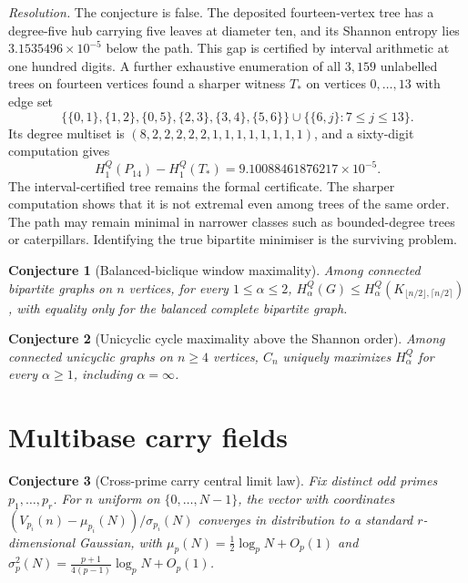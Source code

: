 \documentclass[11pt]{article}
\newtheorem{conjecture}{Conjecture}
\theoremstyle{definition}
\begin{document}
\emph{Resolution.}  The conjecture is false.  The deposited fourteen-vertex tree has a degree-five hub carrying five leaves at diameter ten, and its Shannon entropy lies $3.1535496\times10^{-5}$ below the path.  This gap is certified by interval arithmetic at one hundred digits.  A further exhaustive enumeration of all $3{,}159$ unlabelled trees on fourteen vertices found a sharper witness $T_*$ on vertices $0,\ldots,13$ with edge set
\[
\bigl\{\{0,1\},\{1,2\},\{0,5\},\{2,3\},\{3,4\},\{5,6\}\bigr\}
\mathbin{\cup}\bigl\{\{6,j\}:7\le j\le13\bigr\}.
\]
Its degree multiset is $(8,2,2,2,2,2,1,1,1,1,1,1,1,1)$, and a sixty-digit computation gives
\[
H^Q_1(P_{14})-H^Q_1(T_*)=9.10088461876217\times10^{-5}.
\]
The interval-certified tree remains the formal certificate.  The sharper computation shows that it is not extremal even among trees of the same order.  The path may remain minimal in narrower classes such as bounded-degree trees or caterpillars.  Identifying the true bipartite minimiser is the surviving problem.

\begin{conjecture}[Balanced-biclique window maximality]\label{ab10}
Among connected bipartite graphs on $n$ vertices, for every $1\le\alpha\le2$, $H^Q_\alpha(G)\le H^Q_\alpha(K_{\lfloor n/2\rfloor,\lceil n/2\rceil})$, with equality only for the balanced complete bipartite graph.
\end{conjecture}

\begin{conjecture}[Unicyclic cycle maximality above the Shannon order]\label{ab11}
Among connected unicyclic graphs on $n\ge4$ vertices, $C_n$ uniquely maximizes $H^Q_\alpha$ for every $\alpha\ge1$, including $\alpha=\infty$.
\end{conjecture}

\section{Multibase carry fields}

\begin{conjecture}[Cross-prime carry central limit law]\label{ab12}
Fix distinct odd primes $p_1,\ldots,p_r$.  For $n$ uniform on $\{0,\ldots,N-1\}$, the vector with coordinates $(V_{p_i}(n)-\mu_{p_i}(N))/\sigma_{p_i}(N)$ converges in distribution to a standard $r$-dimensional Gaussian, with $\mu_p(N)=\tfrac12\log_pN+O_p(1)$ and $\sigma_p^2(N)=\tfrac{p+1}{4(p-1)}\log_pN+O_p(1)$.
\end{conjecture}
\end{document}
